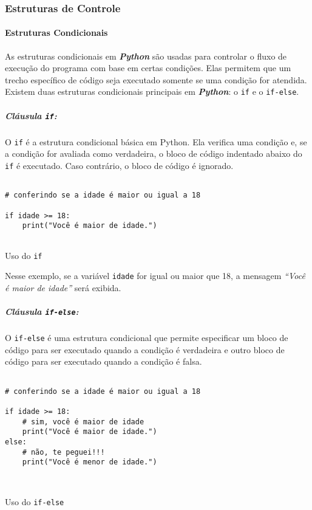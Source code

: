 \documentclass[a4paper, 12pt, onecolumn,singlespacing]{article}
\begin{document}
	\subsubsection{Estruturas de Controle}
	
	\paragraph{Estruturas Condicionais}
As estruturas condicionais em \textbf{\textit{Python}} são usadas para controlar o fluxo de execução do programa com base em certas condições. Elas permitem que um trecho específico de código seja executado somente se uma condição for atendida. Existem duas estruturas condicionais principais em \textbf{\textit{Python}}: o \texttt{if} e o \texttt{if-else}.
	
	\subparagraph{Cláusula \texttt{if}:}
	O \texttt{if} é a estrutura condicional básica em Python. Ela verifica uma condição e, se a condição for avaliada como verdadeira, o bloco de código indentado abaixo do \texttt{if} é executado. Caso contrário, o bloco de código é ignorado.
\begin{listing}[!ht]
	\begin{verbatim}
		
# conferindo se a idade é maior ou igual a 18

if idade >= 18:
	print("Você é maior de idade.")
		
	\end{verbatim}
	\label{clausula_if}
	\caption{Uso do \texttt{if}}
\end{listing}	

	Nesse exemplo, se a variável \texttt{idade} for igual ou maior que 18, a mensagem \textit{``Você é maior de idade''} será exibida.
	
	\subparagraph{Cláusula \texttt{if-else}:} O \texttt{if-else} é uma estrutura condicional que permite especificar um bloco de código para ser executado quando a condição é verdadeira e outro bloco de código para ser executado quando a condição é falsa.
	
\begin{listing}[!ht]
	\begin{verbatim}
		
# conferindo se a idade é maior ou igual a 18
		
if idade >= 18:
	# sim, você é maior de idade
	print("Você é maior de idade.")
else:
	# não, te peguei!!!
	print("Você é menor de idade.")

		
	\end{verbatim}
	\label{clausula_if_else}
	\caption{Uso do \texttt{if-else}}
\end{listing}
\end{document}
